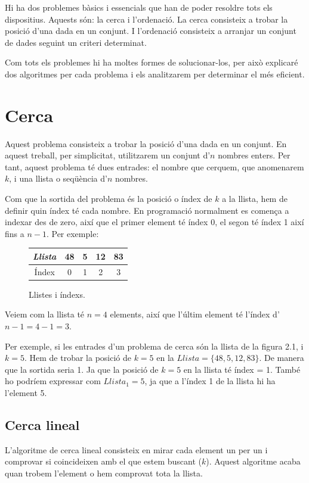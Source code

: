 Hi ha dos problemes bàsics i essencials que han de poder resoldre tots els dispositius. Aquests són: la cerca i l'ordenació. La cerca consisteix a trobar la posició d'una dada en un conjunt. I l'ordenació consisteix a arranjar un conjunt de dades seguint un criteri determinat.

Com tots els problemes hi ha moltes formes de solucionar-los, per això explicaré dos algoritmes per cada problema i els analitzarem per determinar el més eficient.

\section{Cerca}
Aquest problema consisteix a trobar la posició d'una dada en un conjunt. En aquest treball, per simplicitat, utilitzarem un conjunt d'$n$ nombres enters. Per tant, aquest problema té dues entrades: el nombre que cerquem, que anomenarem $k$, i una llista o seqüència d'$n$ nombres. 

Com que la sortida del problema és la posició o índex de $k$ a la llista, hem de definir quin índex té cada nombre. En programació normalment es comença a indexar des de zero, així que el primer element té índex 0, el segon té índex 1 així fins a $n-1$. Per exemple:
\begin{figure}[h]
    \begin{center}
    \renewcommand{\arraystretch}{1.5}
    \begin{tabular}{|c | c | c | c | c |} 
     \hline
     \textit{Llista} & 48 & 5 & 12 & 83 \\ 
     \hline
     Índex & 0 & 1 & 2 & 3 \\
     \hline
    \end{tabular}
    \end{center}
    \caption{Llistes i índexs.}
    \label{fig:my_label}
\end{figure} 

Veiem com la llista té $n = 4$ elements, així que l'últim element té l'índex d'$n-1 = 4-1 = 3$. 

Per exemple, si les entrades d'un problema de cerca són la llista de la figura 2.1, i $k = 5$. Hem de trobar la posició de $k = 5$ en la $Llista = \lbrace 48, 5, 12, 83 \rbrace$. De manera que la sortida seria 1. Ja que la posició de $k = 5$ en la llista té índex = 1. També ho podríem expressar com $Llista_1 = 5$, ja que a l'índex 1 de la llista hi ha l'element 5.

\subsection{Cerca lineal}
L'algoritme de cerca lineal consisteix en mirar cada element un per un i comprovar si coincideixen amb el que estem buscant ($k$). Aquest algoritme acaba quan trobem l'element o hem comprovat tota la llista.

